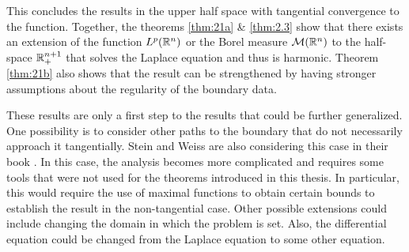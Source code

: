 This concludes the results in the upper half space with tangential convergence to the function. Together, the theorems \ref{thm:21a} \& \ref{thm:2.3} show that there exists an extension of the function $L^p(\mathbb R^n)$ or the Borel measure $\mathcal M(\mathbb R^n)$ to the half-space $\mathbb R^{n+1}_+$ that solves the Laplace equation and thus is harmonic. Theorem \ref{thm:21b} also shows that the result can be strengthened by having stronger assumptions about the regularity of the boundary data. 

These results are only a first step to the results that could be further generalized. One possibility is to consider other paths to the boundary that do not necessarily approach it tangentially. Stein and Weiss are also considering this case in their book \cite{stein_weiss}. In this case, the analysis becomes more complicated and requires some tools that were not used for the theorems introduced in this thesis. In particular, this would require the use of maximal functions to obtain certain bounds to establish the result in the non-tangential case. Other possible extensions could include changing the domain in which the problem is set. Also, the differential equation could be changed from the Laplace equation to some other equation.